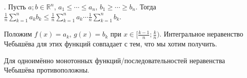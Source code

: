 \documentclass{article}
\begin{document}
\begin{itemize}
\begin{Proof}
        \end{Proof}
        \thm {}. Пусть $a;b\in\mathbb R^n$, $a_1\leqslant\cdots\leqslant a_n$, $b_1\geqslant\cdots\geqslant b_n$. Тогда $\frac1n\sum\limits_{k=1}^na_kb_k\leqslant\frac1n\sum\limits_{k=1}^na_k\cdots\frac1n\sum\limits_{k=1}^nb_k$.
        \begin{Proof}
            Положим $f(x)=a_k$, $g(x)=b_k$ при $x\in[\frac{k-1}n;\frac kn)$. Интегральное неравенство Чебышёва для этих функций совпадает с тем, что мы хотим получить.
        \end{Proof}
        \begin{Comment}
            Для одноимённо монотонных функций/последовательностей неравенства Чебышёва противоположны.
        \end{Comment}
    \end{itemize}
\end{document}
